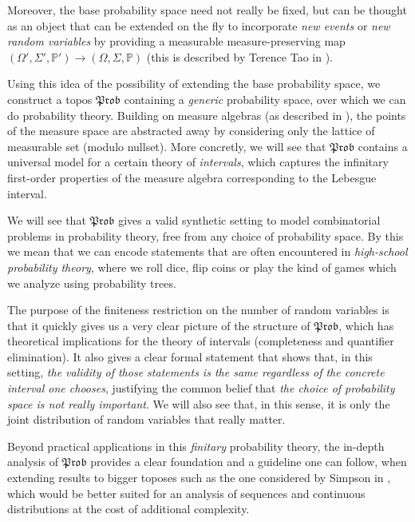\documentclass[a4paper]{amsproc}
\theoremstyle{plain}
\theoremstyle{definition}
\theoremstyle{remark}
\numberwithin{equation}{section}
\newcommand{\Prob}{\mathfrak{Prob}}
\begin{document}
Moreover, the base probability space need not really be fixed, but can be thought as an object that can be extended on the fly to incorporate \emph{new events} or \emph{new random variables} by providing a measurable measure-preserving map $(\Omega',\Sigma',\mathbb{P}') \to (\Omega,\Sigma, \mathbb{P})$ (this is described by Terence Tao in \cite{tao2010review}).

Using this idea of the possibility of extending the base probability space, we construct a topos $\Prob$ containing a \emph{generic} probability space, over which we can do probability theory. Building on measure algebras (as described in \cite{fremlin2012measure}), the points of the measure space are abstracted away by considering only the lattice of measurable set (modulo nullset). More concretly, we will see that $\Prob$ contains a universal model for a certain theory of \emph{intervals}, which captures the infinitary first-order properties of the measure algebra corresponding to the Lebesgue interval.

We will see that $\Prob$ gives a valid synthetic setting to model combinatorial problems in probability theory, free from any choice of probability space. By this we mean that we can encode statements that are often encountered in \emph{high-school probability theory}, where we roll dice, flip coins or play the kind of games which we analyze using probability trees.

The purpose of the finiteness restriction on the number of random variables is that it quickly gives us a very clear picture of the structure of $\Prob$, which has theoretical implications for the theory of intervals (completeness and quantifier elimination). It also gives a clear formal statement that shows that, in this setting, \emph{the validity of those statements is the same regardless of the concrete interval one chooses}, justifying the common belief that \emph{the choice of probability space is not really important}. We will also see that, in this sense, it is only the joint distribution of random variables that really matter.


Beyond practical applications in this \emph{finitary} probability theory, the in-depth analysis of $\Prob$ provides a clear foundation and a guideline one can follow, when extending results to bigger toposes such as the one considered by Simpson in \cite{simpson2017probability}, which would be better suited for an analysis of sequences and continuous distributions at the cost of additional complexity.
\end{document}
